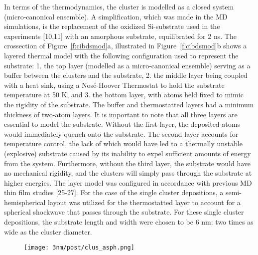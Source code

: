 \begin{selfcite}
In terms of the thermodynamics, the cluster is modelled as a closed system (micro-canonical ensemble). A simplification, which was made in the MD simulations, is the replacement of the oxidized Si-substrate used in the experiments [10,11] with an amorphous \cz substrate, equilibrated for 2 ns. The crossection of Figure~\ref{f:cibdsmod}a, illustrated in Figure~\ref{f:cibdsmod}b shows a layered thermal model with the following configuration used to represent the substrate: 1. the top layer (modelled as a micro-canonical ensemble) serving as a buffer between the clusters and the substrate, 2. the middle layer being coupled with a heat sink, using a Nosé-Hoover Thermostat to hold the substrate temperature at 50 K, and 3. the bottom layer, with atoms held fixed to mimic the rigidity of the substrate. The buffer and thermostatted layers had a minimum thickness of two-atom layers. It is important to note that all three layers are essential to model the substrate. Without the first layer, the deposited atoms would immediately quench onto the substrate. The second layer accounts for temperature control, the lack of which would have led to a thermally unstable (explosive) substrate caused by its inability to expel sufficient amounts of energy from the system. Furthermore, without the third layer, the substrate would have no mechanical rigidity, and the clusters will simply pass through the substrate at higher energies. The layer model was configured in accordance with previous MD thin film studies [25-27]. For the case of the single cluster depositions, a semi-hemispherical layout was utilized for the thermostatted layer to account for a spherical shockwave that passes through the substrate. For these single cluster depositions, the substrate length and width were chosen to be 6 nm: two times as wide as the cluster diameter. \par

\begin{figure}
	\texttt{[image: 3nm/post/clus\_asph.png]}
	\label{f:cibdsasph}
\end{figure}%


\end{selfcite}
